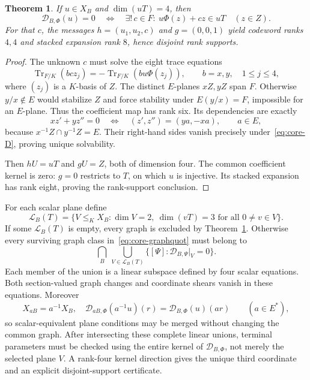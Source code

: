 \documentclass[12pt,letterpaper,onecolumn]{article}
\newtheorem{theorem}{Theorem}
\theoremstyle{definition}
\theoremstyle{remark}
\DeclareMathOperator{\Tr}{Tr}
\begin{document}
\begin{theorem}\label{thm:core-compatibility}
If \(u\in X_B\) and \(\dim(uT)=4\), then
\[
\mathcal D_{B,\Phi}(u)=0
\quad\Longleftrightarrow\quad
\exists!\,c\in F:\ u\Phi(z)+cz\in uT\quad(z\in Z).
\]
For that \(c\), the messages \(h=(u_1,u_2,c)\) and \(g=(0,0,1)\) yield codeword ranks \(4,4\) and stacked expansion rank \(8\), hence disjoint rank supports.
\end{theorem}
\begin{proof}
The unknown \(c\) must solve the eight trace equations
\[
\Tr_{F/K}(bc z_j)=-\Tr_{F/K}(bu\Phi(z_j)),
\qquad b=x,y,\quad1\le j\le4,
\]
where \((z_j)\) is a \(K\)-basis of \(Z\).
The distinct \(E\)-planes \(xZ,yZ\) span \(F\). Otherwise \(y/x\notin E\) would stabilize \(Z\) and force stability under \(E(y/x)=F\), impossible for an \(E\)-plane.
Thus the coefficient map has rank six. Its dependencies are exactly
\[
xz'+yz''=0
\quad\Longleftrightarrow\quad
(z',z'')=(ya,-xa),\qquad a\in E,
\]
because \(x^{-1}Z\cap y^{-1}Z=E\). Their right-hand sides vanish precisely under~\eqref{eq:core-D}, proving unique solvability.

Then \(hU=uT\) and \(gU=Z\), both of dimension four. The common coefficient kernel is zero: \(g=0\) restricts to \(T\), on which \(u\) is injective. Its stacked expansion has rank eight, proving the rank-support conclusion.
\end{proof}

For each scalar plane define
\[
\mathcal L_B(T)=\{V\le_KX_B:\dim V=2,\
\dim(vT)=3\text{ for all }0\ne v\in V\}.
\]
If some \(\mathcal L_B(T)\) is empty, every graph is excluded by Theorem~\ref{thm:core-compatibility}. Otherwise every surviving graph class in~\eqref{eq:core-graphquot} must belong to
\begin{equation}\label{eq:core-union}
\bigcap_B\ \bigcup_{V\in\mathcal L_B(T)}
\{[\Psi]:\mathcal D_{B,\Psi}|_V=0\}.
\end{equation}
Each member of the union is a linear subspace defined by four scalar equations.
Both section-valued graph changes and coordinate shears vanish in these equations. Moreover
\[
X_{aB}=a^{-1}X_B,\quad
\mathcal D_{aB,\Phi}(a^{-1}u)(r)=\mathcal D_{B,\Phi}(u)(ar)
\qquad(a\in E^*),
\]
so scalar-equivalent plane conditions may be merged without changing the common graph.
After intersecting these complete linear unions, terminal parameters must be checked using the entire kernel of \(\mathcal D_{B,\Phi}\), not merely the selected plane \(V\). A rank-four kernel direction gives the unique third coordinate and an explicit disjoint-support certificate.
\end{document}

